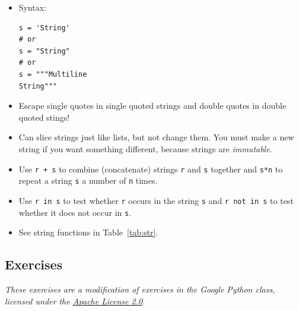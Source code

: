 \documentclass[11pt]{cselabheader}
\begin{document}
\begin{itemize}
  \item Syntax:
    \begin{lstlisting}
s = 'String'
# or
s = "String"
# or
s = """Multiline
String"""
    \end{lstlisting}

  \item Escape single quotes in single quoted strings and double quotes in
    double quoted stings!

  \item Can slice strings just like lists, but not change them. You must make a
    new string if you want something different, because strings are
    \emph{immutable}.

  \item Use \lstinline!r + s! to combine (concatenate) strings \lstinline!r! and
    \lstinline!s! together and
    \lstinline!s*n! to repeat a string \lstinline!s! a number of \lstinline!n!
    times.

  \item Use \lstinline!r in s! to test whether \lstinline!r! occurs in the
    string \lstinline!s! and \lstinline!r not in s! to test whether it does not
    occur in \lstinline!s!.

  \item See string functions in Table~\ref{tab:str}.
\end{itemize}

\subsection{Exercises}
\label{subsec:stringsex}

\emph{These exercises are a modification of exercises in the Google Python
  class, licensed under the
  \href{http://www.apache.org/licenses/LICENSE-2.0.html}{Apache License 2.0}.}
\end{document}
